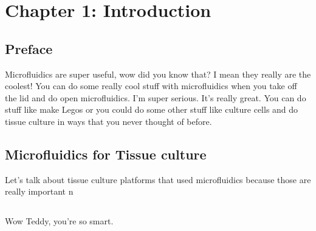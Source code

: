 \chapter{Chapter 1: Introduction}\label{Chap:Introduction}





\section{Preface}
Microfluidics are super useful, wow did you know that? I mean they really are the coolest! You can do some really cool stuff with microfluidics when you take off the lid and do open microfluidics. I'm super serious. It's really great. You can do stuff like make Legos or you could do some other stuff like culture cells and do tissue culture in ways that you never thought of before.

\section{Microfluidics for Tissue culture}
Let's talk about tissue culture platforms that used microfluidics because those are really important  n


\section{}
Wow Teddy, you're so smart\cite{Vogler2004a}.




